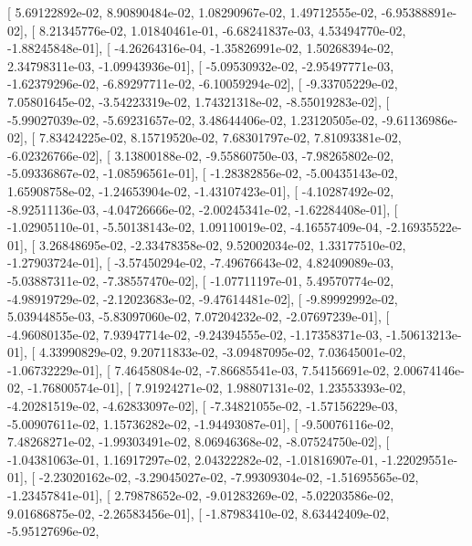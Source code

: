 \documentclass{article}
\begin{document}
       [  5.69122892e-02,   8.90890484e-02,   1.08290967e-02,
          1.49712555e-02,  -6.95388891e-02],
       [  8.21345776e-02,   1.01840461e-01,  -6.68241837e-03,
          4.53494770e-02,  -1.88245848e-01],
       [ -4.26264316e-04,  -1.35826991e-02,   1.50268394e-02,
          2.34798311e-03,  -1.09943936e-01],
       [ -5.09530932e-02,  -2.95497771e-03,  -1.62379296e-02,
         -6.89297711e-02,  -6.10059294e-02],
       [ -9.33705229e-02,   7.05801645e-02,  -3.54223319e-02,
          1.74321318e-02,  -8.55019283e-02],
       [ -5.99027039e-02,  -5.69231657e-02,   3.48644406e-02,
          1.23120505e-02,  -9.61136986e-02],
       [  7.83424225e-02,   8.15719520e-02,   7.68301797e-02,
          7.81093381e-02,  -6.02326766e-02],
       [  3.13800188e-02,  -9.55860750e-03,  -7.98265802e-02,
         -5.09336867e-02,  -1.08596561e-01],
       [ -1.28382856e-02,  -5.00435143e-02,   1.65908758e-02,
         -1.24653904e-02,  -1.43107423e-01],
       [ -4.10287492e-02,  -8.92511136e-03,  -4.04726666e-02,
         -2.00245341e-02,  -1.62284408e-01],
       [ -1.02905110e-01,  -5.50138143e-02,   1.09110019e-02,
         -4.16557409e-04,  -2.16935522e-01],
       [  3.26848695e-02,  -2.33478358e-02,   9.52002034e-02,
          1.33177510e-02,  -1.27903724e-01],
       [ -3.57450294e-02,  -7.49676643e-02,   4.82409089e-03,
         -5.03887311e-02,  -7.38557470e-02],
       [ -1.07711197e-01,   5.49570774e-02,  -4.98919729e-02,
         -2.12023683e-02,  -9.47614481e-02],
       [ -9.89992992e-02,   5.03944855e-03,  -5.83097060e-02,
          7.07204232e-02,  -2.07697239e-01],
       [ -4.96080135e-02,   7.93947714e-02,  -9.24394555e-02,
         -1.17358371e-03,  -1.50613213e-01],
       [  4.33990829e-02,   9.20711833e-02,  -3.09487095e-02,
          7.03645001e-02,  -1.06732229e-01],
       [  7.46458084e-02,  -7.86685541e-03,   7.54156691e-02,
          2.00674146e-02,  -1.76800574e-01],
       [  7.91924271e-02,   1.98807131e-02,   1.23553393e-02,
         -4.20281519e-02,  -4.62833097e-02],
       [ -7.34821055e-02,  -1.57156229e-03,  -5.00907611e-02,
          1.15736282e-02,  -1.94493087e-01],
       [ -9.50076116e-02,   7.48268271e-02,  -1.99303491e-02,
          8.06946368e-02,  -8.07524750e-02],
       [ -1.04381063e-01,   1.16917297e-02,   2.04322282e-02,
         -1.01816907e-01,  -1.22029551e-01],
       [ -2.23020162e-02,  -3.29045027e-02,  -7.99309304e-02,
         -1.51695565e-02,  -1.23457841e-01],
       [  2.79878652e-02,  -9.01283269e-02,  -5.02203586e-02,
          9.01686875e-02,  -2.26583456e-01],
       [ -1.87983410e-02,   8.63442409e-02,  -5.95127696e-02,
\end{document}
